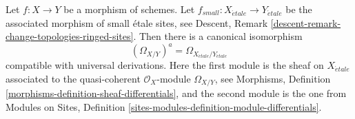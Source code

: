\begin{lemma}
\label{lemma-match-modules-differentials}
Let $f : X \to Y$ be a morphism of schemes. Let
$f_{small} : X_{\acute{e}tale} \to Y_{\acute{e}tale}$ be the associated
morphism of small \'etale sites, see
Descent, Remark \ref{descent-remark-change-topologies-ringed-sites}.
Then there is a canonical isomorphism
$$
(\Omega_{X/Y})^a = \Omega_{X_{\acute{e}tale}/Y_{\acute{e}tale}}
$$
compatible with universal derivations. Here the first module
is the sheaf on $X_{\acute{e}tale}$ associated
to the quasi-coherent $\mathcal{O}_X$-module $\Omega_{X/Y}$, see
Morphisms, Definition \ref{morphisms-definition-sheaf-differentials},
and the second module is the one from
Modules on Sites,
Definition \ref{sites-modules-definition-module-differentials}.
\end{lemma}

